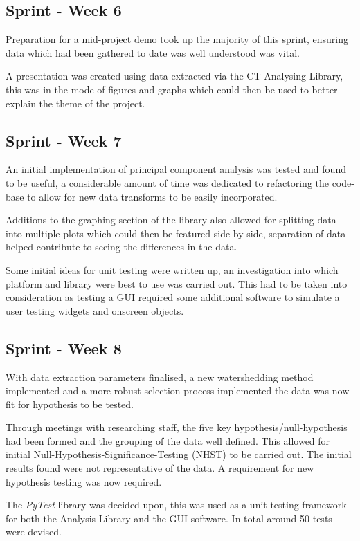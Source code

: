 \documentclass[11pt]{report}
\begin{document}
\subsection{Sprint - Week 6}
\label{sec:org6e966d1}
Preparation for a mid-project demo took up the majority of this sprint, ensuring data which had been gathered to date was well understood was vital.

A presentation was created using data extracted via the CT Analysing Library, this was in the mode of figures and graphs which could then be used to better explain the theme of the project.

\subsection{Sprint - Week 7}
\label{sec:org3a1f53c}
An initial implementation of principal component analysis was tested and found to be useful, a considerable amount of time was dedicated to refactoring the code-base to allow for new data transforms to be easily incorporated.

Additions to the graphing section of the library also allowed for splitting data into multiple plots which could then be featured side-by-side, separation of data helped contribute to seeing the differences in the data.

Some initial ideas for unit testing were written up, an investigation into which platform and library were best to use was carried out. This had to be taken into consideration as testing a GUI required some additional software to simulate a user testing widgets and onscreen objects.

\subsection{Sprint - Week 8}
\label{sec:org070b868}
With data extraction parameters finalised, a new watershedding method implemented and a more robust selection process implemented the data was now fit for hypothesis to be tested.

Through meetings with researching staff, the five key hypothesis/null-hypothesis had been formed and the grouping of the data well defined. This allowed for initial Null-Hypothesis-Significance-Testing (NHST) to be carried out. The initial results found were not representative of the data. A requirement for new hypothesis testing was now required.

The \emph{PyTest} library was decided upon, this was used as a unit testing framework for both the Analysis Library and the GUI software. In total around 50 tests were devised.
\end{document}
